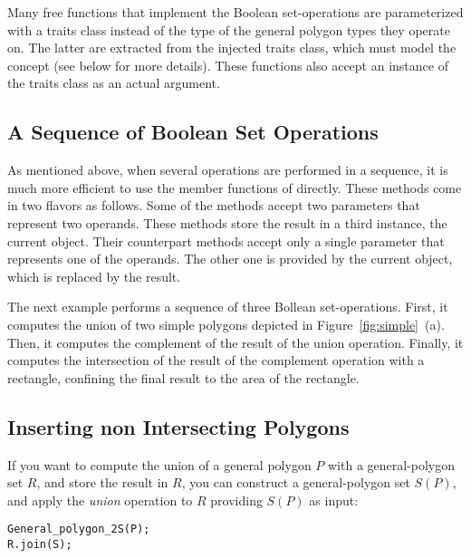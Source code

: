 Many free functions that implement the Boolean set-operations are
parameterized with a traits class instead of the type of the general
polygon types they operate on. The latter are extracted from the injected
traits class, which must model the concept 
 (see below for more details).
These functions also accept an instance of the traits class as an actual 
argument.

\subsection{A Sequence of Boolean Set Operations}
\label{bobs_ssec:sequence}
As mentioned above, when several operations are performed in a 
sequence, it is much more efficient to use the member functions of
 directly.
These methods come in two flavors as follows. Some of the methods accept two
parameters that represent two operands. These methods store the result
in a third instance, the current object. Their counterpart methods
accept only a single parameter that represents one of the operands.
The other one is provided by the current object, which is replaced by
the result.

The next example performs a sequence of three Bollean set-operations.
First, it computes the union of two simple polygons depicted in
Figure~\ref{fig:simple}~(a). Then, it computes the complement of the result
of the union operation. Finally, it computes the intersection of the result
of the complement operation with a rectangle, confining the final result to 
the area of the rectangle.


\subsection{Inserting non Intersecting Polygons}
\label{bobs_ssec:insert}
If you want to compute the union of a general polygon $P$ with a
general-polygon set $R$, and store the result in $R$, you can construct
a general-polygon set $S(P)$, and apply the {\em union} operation to
$R$ providing $S(P)$ as input:

\begin{alltt}
General_polygon_2 S(P);
R.join(S);
\end{alltt}

